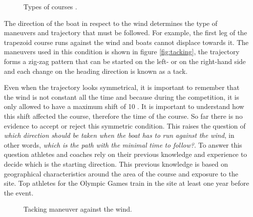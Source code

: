 \begin{figure}[ht]
  \centering
  \hfill
  \caption{Types of courses \cite{instr_rio}.}
\label{fig:typecourses} 
\end{figure}

The direction of the boat in respect to the wind determines the type of maneuvers and trajectory that must be followed. For example, the first leg of the trapezoid course runs against the wind and boats cannot displace towards it. The maneuvers used in this condition is shown in figure \ref{fig:tacking}, the trajectory forms a zig-zag pattern that can be started on the left- or on the right-hand side and each change on the heading direction is known as a tack. \par 

Even when the trajectory looks symmetrical, it is important to remember that the wind is not constant all the time and because during the competition, it is only allowed to have a maximum shift of 10 \degree \cite{race_pol}. It is important to understand how this shift affected the course, therefore the time of the course. So far there is no evidence to accept or reject this symmetric condition. This raises the question of \textit{which direction should be taken when the boat has to run against the wind}, in other words, \textit{which is the path with the minimal time to follow?}. To answer this question athletes and coaches rely on their previous knowledge and experience to decide which is the starting direction. This previous knowledge is based on geographical characteristics around the area of the course and exposure to the site. Top athletes for the Olympic Games train in the site at least one year before the event.\par 
\begin{figure}[ht]
  \centering
  \hfill
   \centering
  \caption{Tacking maneuver against the wind.}
\label{fig:tack_against_wind} 
\end{figure}

